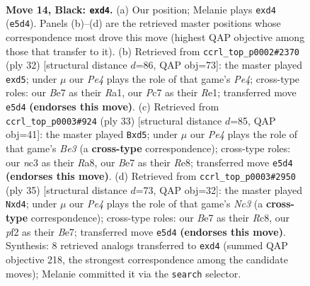 \documentclass[11pt]{article}
\begin{document}
\clearpage

\begin{figure}[p]\centering
\begin{subfigure}{0.46\textwidth}\centering
\resizebox{\linewidth}{!}{%
\newchessgame
\chessboard[
  setfen={1rr3k1/ppp1bpPp/1n1qb3/4p3/P2NP3/2N3P1/1P3PB1/R1BQK2R b KQ - 0 14},
  showmover=false,
  pgfstyle=straightmove, color=movearrow, markmove={e5-d4}
]}
\caption{}
\end{subfigure}\hfill
\begin{subfigure}{0.46\textwidth}\centering
\resizebox{\linewidth}{!}{%
\newchessgame
\chessboard[
  setfen={r1bqr1k1/pp4bp/5pp1/3np3/1Bn1P3/5NP1/PP3PBP/R2QR1K1 w - - 0 17},
  showmover=false,
  pgfstyle=straightmove, color=movearrow, markmove={e4-d5}
]}
\caption{}
\end{subfigure}
\\[4pt]
\begin{subfigure}{0.46\textwidth}\centering
\resizebox{\linewidth}{!}{%
\newchessgame
\chessboard[
  setfen={r3r1k1/2pq1pp1/p1n1b2p/1p1Np3/8/2PP1N1P/PPB2PP1/R2QR1K1 b - - 0 17},
  showmover=false,
  pgfstyle=straightmove, color=movearrow, markmove={e6-d5}
]}
\caption{}
\end{subfigure}\hfill
\begin{subfigure}{0.46\textwidth}\centering
\resizebox{\linewidth}{!}{%
\newchessgame
\chessboard[
  setfen={2r2rk1/1p1qbppp/pBnpb3/P7/3NPR2/8/1PP1B1PP/R2Q3K b - - 2 18},
  showmover=false,
  pgfstyle=straightmove, color=movearrow, markmove={c6-d4}
]}
\caption{}
\end{subfigure}
\caption{\textbf{Move 14, Black: \texttt{exd4}.} (a) Our position; Melanie plays \texttt{exd4} (\texttt{e5d4}). Panels (b)--(d) are the retrieved master positions whose correspondence most drove this move (highest QAP objective among those that transfer to it). (b) Retrieved from \texttt{ccrl\_top\_p0002\#2370} (ply 32) [structural distance $d$=86, QAP obj=73]: the master played \texttt{exd5}; under $\mu$ our \emph{Pe4} plays the role of that game's \emph{Pe4}; cross-type roles: our \emph{B}e7 as their \emph{R}a1, our \emph{P}c7 as their \emph{R}e1; transferred move \texttt{e5d4} \textbf{(endorses this move)}. (c) Retrieved from \texttt{ccrl\_top\_p0003\#924} (ply 33) [structural distance $d$=85, QAP obj=41]: the master played \texttt{Bxd5}; under $\mu$ our \emph{Pe4} plays the role of that game's \emph{Be3} (a \textbf{cross-type} correspondence); cross-type roles: our \emph{n}c3 as their \emph{R}a8, our \emph{B}e7 as their \emph{R}e8; transferred move \texttt{e5d4} \textbf{(endorses this move)}. (d) Retrieved from \texttt{ccrl\_top\_p0003\#2950} (ply 35) [structural distance $d$=73, QAP obj=32]: the master played \texttt{Nxd4}; under $\mu$ our \emph{Pe4} plays the role of that game's \emph{Nc3} (a \textbf{cross-type} correspondence); cross-type roles: our \emph{B}e7 as their \emph{R}c8, our \emph{p}f2 as their \emph{B}e7; transferred move \texttt{e5d4} \textbf{(endorses this move)}. Synthesis: 8 retrieved analogs transferred to \texttt{exd4} (summed QAP objective 218, the strongest correspondence among the candidate moves); Melanie committed it via the \texttt{search} selector.}
\label{fig:thought-m27}
\end{figure}
\end{document}
